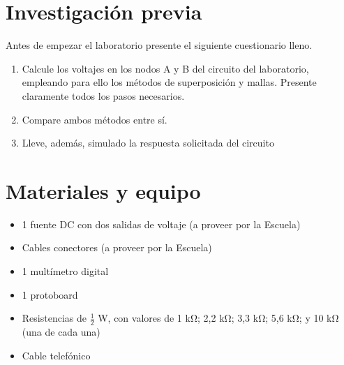 \documentclass{report}
\newcommand{\inv}{Investigación previa}
\newcommand{\mat}{Materiales y equipo}
\newcommand{\antesde}{Antes de empezar el laboratorio presente el siguiente cuestionario lleno.}
\begin{document}
\section{\inv}
\antesde
\begin{enumerate}
\item Calcule los voltajes en los nodos A y B del circuito del laboratorio, empleando
para ello los métodos de superposición y mallas. Presente claramente todos
los pasos necesarios.
\item Compare ambos métodos entre sí.
\item Lleve, además, simulado la respuesta solicitada del circuito
\end{enumerate}

\section{\mat}
\begin{itemize}
\item 1 fuente DC con dos salidas de voltaje (a proveer por la Escuela)
\item Cables conectores (a proveer por la Escuela)
\item 1 multímetro digital
\item 1 protoboard
\item Resistencias de $\frac{1}{2}$ \si{\watt}, con valores de 1 \si{\kilo\ohm}; 2,2 \si{\kilo\ohm}; 3,3 \si{\kilo\ohm}; 5,6 \si{\kilo\ohm}; y 10 \si{\kilo\ohm} (una de cada una)
\item Cable telefónico
\end{itemize}
\end{document}
